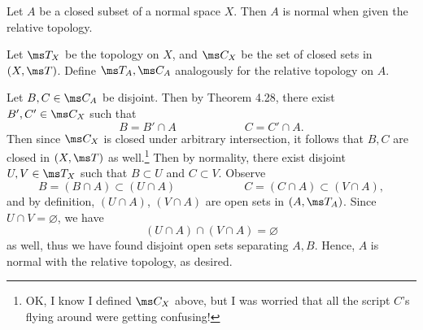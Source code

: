 \documentclass{fkpset}
\begin{document}
  \begin{problem}[5.23]
    Let $A$ be a closed subset of a normal space $X$. Then $A$ is
    normal when given the relative topology.
  \end{problem}
  \begin{solution}
    Let $\ms T_X$ be the topology on $X$, and $\ms C_X$ be the set of
    closed sets in $(X,\ms T)$. Define $\ms T_A, \ms C_A$ analogously
    for the relative topology on $A$.

    Let $B,C \in \ms C_A$ be disjoint. Then by Theorem 4.28, there
    exist $B', C' \in \ms C_X$ such that
    \[
      B = B' \cap A \qquad \qquad \qquad C = C' \cap A.
    \]
    Then since $\ms C_X$ is closed under arbitrary intersection, it
    follows that $B, C$ are closed in $(X, \ms T)$ as
    well.\footnote{OK, I know I defined $\ms C_X$ above, but I was
      worried that all the script $C$'s flying around were getting
      confusing!} Then by normality, there exist disjoint $U,V \in \ms
    T_X$ such that $B \subset U$ and $C \subset V$. Observe
    \[
      B = (B \cap A) \subset (U \cap A) \qquad \qquad \qquad C = (C
      \cap A) \subset (V \cap A),
    \]
    and by definition, $(U \cap A)$, $(V \cap A)$ are open sets in
    $(A, \ms T_A)$. Since $U \cap V = \varnothing$, we have
    \[
      (U\cap A) \cap (V\cap A)= \varnothing
    \]
    as well, thus we have found disjoint open sets separating $A,B$.
    Hence, $A$ is normal with the relative topology, as desired.
  \end{solution}
\end{document}
